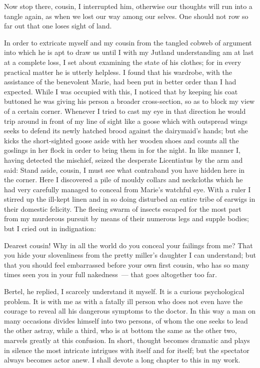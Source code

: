 \documentclass[12pt]{article}
\begin{document}
Now stop there, cousin, I interrupted him, otherwise our thoughts
will run into a tangle again, as when we lost our way among our
selves. One should not row so far out that one loses sight of land.

In order to extricate myself and my cousin from the tangled cobweb of
argument into which he is apt to draw us until I with my Jutland
understanding am at last at a complete loss, I set about examining
the state of his clothes; for in every practical matter he is utterly
helpless. I found that his wardrobe, with the assistance of the
benevolent Marie, had been put in better order than I had expected.
While I was occupied with this, I noticed that by keeping his coat
buttoned he was giving his person a broader cross-section, so as to
block my view of a certain corner. Whenever I tried to cast my eye
in that direction he would trip around in front of my line of sight
like a goose which with outspread wings seeks to defend its newly
hatched brood against the dairymaid's hands; but she kicks the
short-sighted goose aside with her wooden shoes and counts all the
goslings in her flock in order to bring them in for the night.
In like manner I, having detected the mischief, seized the desperate
Licentiatus by the arm and said: Stand aside, cousin, I must see
what contraband you have hidden here in the corner. Here I discovered
a pile of mouldy collars and neckcloths which he had very carefully
managed to conceal from Marie's watchful eye. With a ruler I stirred
up the ill-kept linen and in so doing disturbed an entire tribe of
earwigs in their domestic felicity. The fleeing swarm of insects
escaped for the most part from my murderous pursuit by means of their
numerous legs and supple bodies; but I cried out in indignation:

Dearest cousin! Why in all the world do you conceal your failings
from me? That you hide your slovenliness from the pretty miller's
daughter I can understand; but that you should feel embarrassed
before your own first cousin, who has so many times seen you in your
full nakedness~--- that goes altogether too far.

Bertel, he replied, I scarcely understand it myself. It is a
curious psychological problem. It is with me as with a fatally ill
person who does not even have the courage to reveal all his dangerous
symptoms to the doctor. In this way a man on many occasions divides
himself into two persons, of whom the one seeks to lead the other
astray, while a third, who is at bottom the same as the other two,
marvels greatly at this confusion. In short, thought becomes dramatic
and plays in silence the most intricate intrigues with itself and for
itself; but the spectator always becomes actor anew. I shall devote a
long chapter to this in my work.
\end{document}

